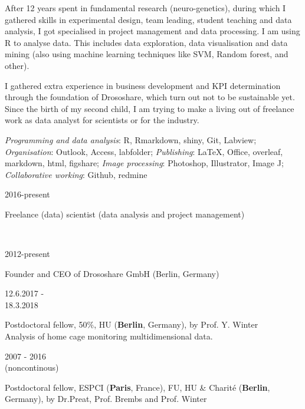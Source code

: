 %
After 12 years spent in fundamental research (neuro-genetics), during which I gathered skills in experimental design, team leading, student teaching and data analysis, I got specialised in project management and data processing. I am using R to analyse data. This includes data exploration, data visualisation and data mining (also using machine learning techniques  like SVM, Random forest, and other). 

I gathered extra experience in business development and KPI determination through the foundation of Drososhare, which turn out not to be sustainable yet. Since the birth of my second child, I am trying to make a living out of freelance work as data analyst for scientists or for the industry.

   \emph{Programming and data analysis}:  R, Rmarkdown, shiny, Git, Labview;\\
\emph{Organisation}: Outlook, Access, labfolder;
\emph{Publishing}: \LaTeX, Office, overleaf, markdown, html, figshare;
\emph{Image processing}: Photoshop, Illustrator, Image J; 
\emph{Collaborative working}:  Github, redmine

%
\parbox{0.20\textwidth}{2016-present}
\parbox[t]{0.77\textwidth}{Freelance (data) scientist (data analysis and project management)%
        }     \hfill \\
%
\parbox{0.20\textwidth}{2012-present}
\parbox[t]{0.77\textwidth}{Founder and CEO 
       of Drososhare GmbH (Berlin, Germany)%
        }\hfill

              
\parbox{0.20\textwidth}{12.6.2017 -\\ 18.3.2018}
\parbox[]{0.77\textwidth}{Postdoctoral fellow, 50\%,
       HU (\textbf{Berlin}, Germany),
        by Prof. Y. Winter\\
       Analysis of home cage monitoring multidimensional data.
        }\hfill

\parbox{0.20\textwidth}{2007 - 2016 \\ (noncontinous)}
\parbox[]{0.77\textwidth}{Postdoctoral fellow,
       ESPCI (\textbf{Paris}, France),  FU,  HU \& Charit\'e (\textbf{Berlin}, Germany),
        by Dr.Preat, Prof. Brembs and  Prof. Winter%
        }\hfill
 

